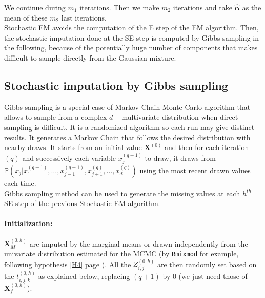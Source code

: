 \documentclass[12pt,a4paper]{report}
\begin{document}
		We continue during $m_1$ iterations. Then we make $m_2$ iterations and take $\hat{\boldsymbol{\alpha}}$ as the mean of these $m_2$ last iterations.\\
		
	Stochastic EM avoids the computation of the E step of the EM algorithm.
	Then, the stochastic imputation done at the SE step is computed by Gibbs sampling in the following, because of the potentially huge number of components that makes difficult to sample directly from the Gaussian mixture.

	\subsection{Stochastic imputation by Gibbs sampling}\label{gibbsmiss}
		Gibbs sampling \cite{casella1992explaining} is a special case of Markov Chain Monte Carlo algorithm \cite{gilks1996markov,chib1995understanding,roberts2001optimal} that allows to sample from a complex $d-$multivariate distribution when direct sampling is difficult. It is a randomized algorithm so each run may give distinct results. It generates a Markov Chain that follows the desired distribution with nearby draws. It starts from an initial value $\boldsymbol{X}^{(0)}$ and then for each iteration $(q)$ and successively each variable $x_j^{(q+1)}$ to draw, it draws from $\mathbb{P}(x_j|x_1^{(q+1)}, \dots,x_{j-1}^{(q+1)},x_{j+1}^{(q)},\dots,x_d^{(q)})$ using the most recent drawn values each time. \\
		
		Gibbs sampling method can be used to generate the missing values at each $h^{th}$ SE step of the previous Stochastic EM algorithm. 
		\paragraph{Initialization:}  %
		$\boldsymbol{X}_M^{(0,h)}$ are imputed by the marginal means or drawn independently from the univariate distribution estimated for the MCMC (by {\tt Rmixmod} for example, following hypothesis \ref{H4} page \pageref{H4}). All the $Z_{i,j}^{(0,h)}$ are then randomly set based on the $t_{i,j,k}^{(0,h)}$ as explained below, replacing $(q+1)$ by $0$ (we just need those of $\boldsymbol{X}_f^{(0,h)}$). 
\end{document}
